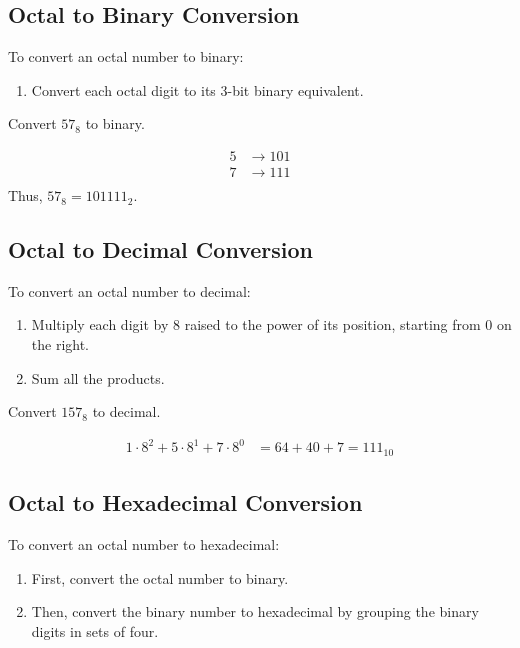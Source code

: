 \subsection*{Octal to Binary Conversion}
To convert an octal number to binary:
\begin{enumerate}
    \item Convert each octal digit to its 3-bit binary equivalent.
\end{enumerate}

\begin{example}Convert \(57_8\) to binary.

\begin{solution}
\[
\begin{aligned}
5 & \rightarrow 101 \\
7 & \rightarrow 111 \\
\end{aligned}
\]
Thus, \(57_8 = 101111_2\). \end{solution}

\end{example}

\subsection*{Octal to Decimal Conversion}
To convert an octal number to decimal:
\begin{enumerate}
    \item Multiply each digit by 8 raised to the power of its position, starting from 0 on the right.
    \item Sum all the products.
\end{enumerate}

\begin{example}Convert \(157_8\) to decimal.

\begin{solution}
    
\[
\begin{aligned}
1 \cdot 8^2 + 5 \cdot 8^1 + 7 \cdot 8^0 & = 64 + 40 + 7 = 111_{10}
\end{aligned}
\] \end{solution}

\end{example}

\subsection*{Octal to Hexadecimal Conversion}
To convert an octal number to hexadecimal:
\begin{enumerate}
    \item First, convert the octal number to binary.
    \item Then, convert the binary number to hexadecimal by grouping the binary digits in sets of four.
\end{enumerate}

